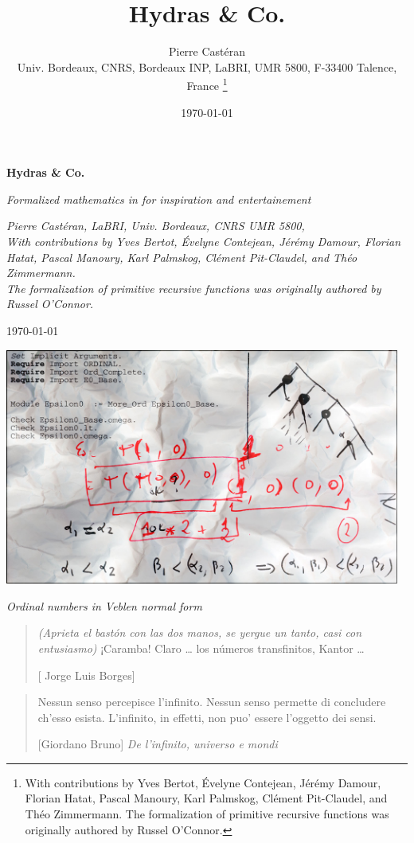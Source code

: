 \documentclass[twoside,a4paper]{book}
\author{Pierre Castéran\\ Univ. Bordeaux, CNRS, Bordeaux INP, LaBRI, UMR 5800, F-33400 Talence, France \thanks{With contributions by Yves Bertot, \'Evelyne Contejean,  Jérémy Damour, Florian Hatat, Pascal Manoury, Karl Palmskog, Clément Pit-Claudel, and Théo Zimmermann. The formalization of primitive recursive functions was originally authored by 
Russel O'Connor\cite{OConnor05}.}}
\date{\today}
\title{Hydras \& Co.}
\begin{document}
\begin{titlepage}
   \begin{center}
       \vspace*{1cm}

       \textbf{\Huge Hydras \& Co.}

       \vspace{0.5cm}
        {\emph{\Large Formalized mathematics in \coq for inspiration and entertainement}}
            
       \vspace{1.5cm}

       \emph{Pierre Castéran, LaBRI, Univ. Bordeaux, CNRS UMR 5800, \\ With contributions by Yves Bertot, \'Evelyne Contejean,  Jérémy Damour, Florian Hatat, Pascal Manoury, Karl Palmskog, Clément Pit-Claudel, and Théo Zimmermann. \\ The formalization of primitive recursive functions was originally authored by Russel O'Connor.}%

 \vfill
        \today 
   
    
            
      \end{center}
\vfill
      \centering
      \includegraphics[width=13cm]{epsilon0.jpg}
      \centerline{\emph{\small {\color{darkblue}Ordinal numbers in Veblen normal form}}}
\end{titlepage}


\clearpage
\newpage
\thispagestyle{empty}
\begin{quote}
 \emph{(Aprieta el bast\'on con las dos manos, se yergue un tanto,
casi con entusiasmo)} ¡Caramba! Claro \dots{} los n\'umeros
transfinitos, Kantor \dots{}

[ Jorge Luis Borges]
\end{quote}
\vspace{17mm}
\begin{quote}
  Nessun senso percepisce l'infinito. Nessun senso permette di concludere ch'esso esista. L'infinito, in effetti, non puo' essere l'oggetto dei sensi.

  [Giordano Bruno] \emph{De l'infinito, universo e mondi}
\end{quote}
\end{document}
